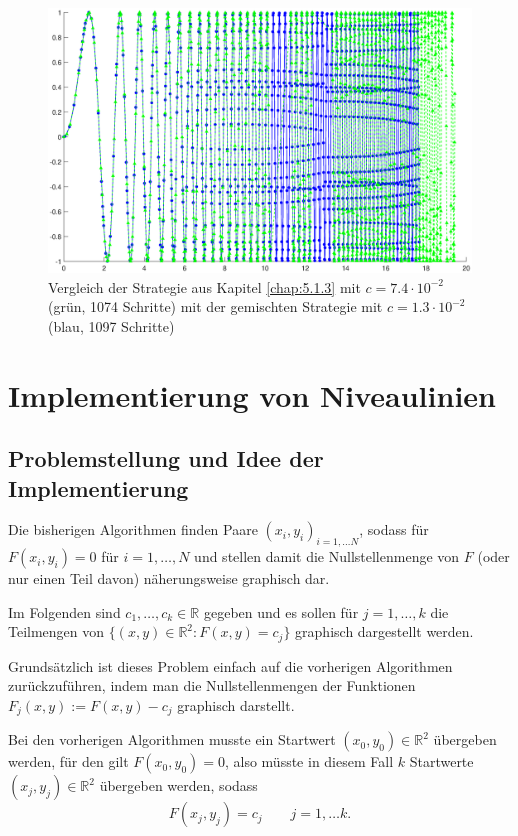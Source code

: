 \documentclass[a4paper,11pt,bibliography=totoc,listof=totoc,headinclude=true,cleardoublepage=empty,oneside]{scrartcl}
\newcommand{\R}{\mathbb{R}}
\begin{document}
\begin{figure}[ht]
	\centering
	\includegraphics[trim = 41mm 0mm 30mm 0mm, clip, width=\linewidth]{plots/adapt/bg}
	\caption{Vergleich der Strategie aus Kapitel \ref{chap:5.1.3} mit $c=7.4\cdot10^{-2}$ (grün, 1074 Schritte) mit der gemischten Strategie mit $c=1.3 \cdot10^{-2}$ (blau, 1097 Schritte) }
	\label{fig:bg}
\end{figure}

\section{Implementierung von Niveaulinien}
\subsection{Problemstellung und Idee der Implementierung}

Die bisherigen Algorithmen finden Paare $(x_i,y_i)_{i=1,\dots N}$, sodass für $F(x_i,y_i)=0$ für $i=1,\dots, N$ und stellen damit die Nullstellenmenge von $F$ (oder nur einen Teil davon) näherungsweise graphisch dar. 

Im Folgenden sind $c_1,\dots, c_k \in \R$ gegeben und es sollen für $j=1,\dots,k$ die Teilmengen von $\{ (x,y) \in \R^2 : F(x,y)=c_j \}$ graphisch dargestellt werden.

Grundsätzlich ist dieses Problem einfach auf die vorherigen Algorithmen zurückzuführen, indem man die Nullstellenmengen der Funktionen $F_j(x,y) := F(x,y) -c_j$ graphisch darstellt.

Bei den vorherigen Algorithmen musste ein Startwert $(x_0,y_0) \in \R^2$ übergeben werden, für den gilt $F(x_0,y_0)=0$, also müsste in diesem Fall $k$ Startwerte $(x_j,y_j) \in \R^2$ übergeben werden, sodass
\[
F(x_j,y_j) = c_j \qquad j=1,\dots k.
\]
\end{document}
